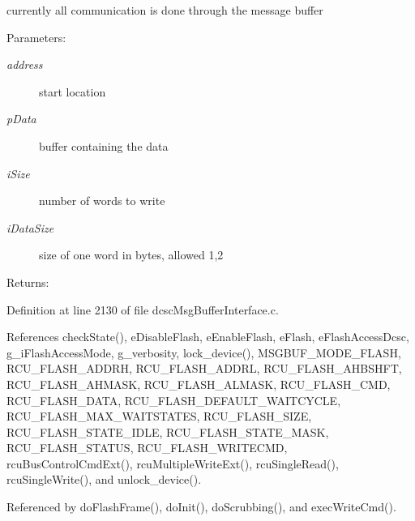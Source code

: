 currently all communication is done through the message buffer \begin{Desc}
\item[Parameters:]
\begin{description}
\item[{\em address}]start location \item[{\em p\-Data}]buffer containing the data \item[{\em i\-Size}]number of words to write \item[{\em i\-Data\-Size}]size of one word in bytes, allowed 1,2 \end{description}
\end{Desc}
\begin{Desc}
\item[Returns:]\end{Desc}


Definition at line 2130 of file dcsc\-Msg\-Buffer\-Interface.c.

References check\-State(), e\-Disable\-Flash, e\-Enable\-Flash, e\-Flash, e\-Flash\-Access\-Dcsc, g\_\-i\-Flash\-Access\-Mode, g\_\-verbosity, lock\_\-device(), MSGBUF\_\-MODE\_\-FLASH, RCU\_\-FLASH\_\-ADDRH, RCU\_\-FLASH\_\-ADDRL, RCU\_\-FLASH\_\-AHBSHFT, RCU\_\-FLASH\_\-AHMASK, RCU\_\-FLASH\_\-ALMASK, RCU\_\-FLASH\_\-CMD, RCU\_\-FLASH\_\-DATA, RCU\_\-FLASH\_\-DEFAULT\_\-WAITCYCLE, RCU\_\-FLASH\_\-MAX\_\-WAITSTATES, RCU\_\-FLASH\_\-SIZE, RCU\_\-FLASH\_\-STATE\_\-IDLE, RCU\_\-FLASH\_\-STATE\_\-MASK, RCU\_\-FLASH\_\-STATUS, RCU\_\-FLASH\_\-WRITECMD, rcu\-Bus\-Control\-Cmd\-Ext(), rcu\-Multiple\-Write\-Ext(), rcu\-Single\-Read(), rcu\-Single\-Write(), and unlock\_\-device().

Referenced by do\-Flash\-Frame(), do\-Init(), do\-Scrubbing(), and exec\-Write\-Cmd().

